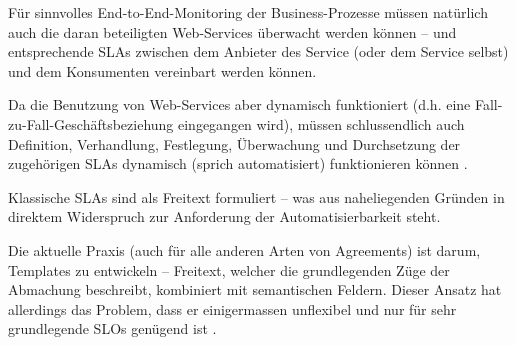 \documentclass[11pt,listof=totoc]{scrreprt} %
\theoremstyle{definition}
\begin{document}
Für sinnvolles End-to-End-Monitoring der Business-Prozesse müssen natürlich auch die daran beteiligten Web-Services überwacht werden können -- und entsprechende SLAs zwischen dem Anbieter des Service (oder dem Service selbst) und dem Konsumenten vereinbart werden können.

Da die Benutzung von Web-Services aber dynamisch funktioniert (d.h. eine Fall-zu-Fall-Geschäftsbeziehung eingegangen wird), müssen schlussendlich auch Definition, Verhandlung, Festlegung, Überwachung und Durchsetzung der zugehörigen SLAs dynamisch (sprich automatisiert) funktionieren können \cite{ibm:wslaPaper}.

Klassische SLAs sind als Freitext formuliert -- was aus naheliegenden Gründen in direktem Widerspruch zur Anforderung der Automatisierbarkeit steht.

Die aktuelle Praxis (auch für alle anderen Arten von Agreements) ist darum, Templates zu entwickeln -- Freitext, welcher die grundlegenden Züge der Abmachung beschreibt, kombiniert mit semantischen Feldern. Dieser Ansatz hat allerdings das Problem, dass er einigermassen unflexibel und nur für sehr grundlegende SLOs genügend ist \cite{ibm:wslaPaper}.
\end{document}
